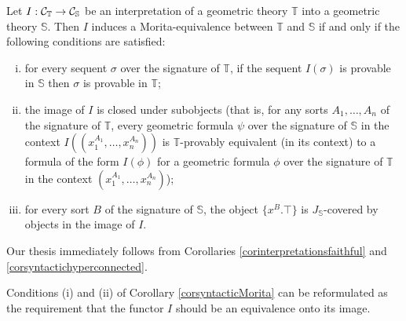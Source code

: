 \documentclass[a4paper,12pt]{article}
\begin{document}
\begin{corollary}\label{corsyntacticMorita}
	Let $I:{\cal C}_{\mathbb T}\to {\cal C}_{\mathbb S}$ be an interpretation of a geometric theory $\mathbb T$ into a geometric theory ${\mathbb S}$. Then $I$ induces a Morita-equivalence between $\mathbb T$ and $\mathbb S$ if and only if the following conditions are satisfied:
	
	\begin{enumerate}[(i)]
		\item for every sequent $\sigma$ over the signature of $\mathbb T$, if the sequent $I(\sigma)$ is provable in $\mathbb S$ then $\sigma$ is provable in $\mathbb T$;
		
		\item the image of $I$ is closed under subobjects (that is, for any sorts $A_{1}, \ldots, A_{n}$ of the signature of $\mathbb T$, every geometric formula $\psi$ over the signature of $\mathbb S$ in the context $I((x_{1}^{A_{1}}, \ldots, x_{n}^{A_{n}}))$ is $\mathbb T$-provably equivalent (in its context) to a formula of the form $I(\phi)$ for a geometric formula $\phi$ over the signature of $\mathbb T$ in the context $(x_{1}^{A_{1}}, \ldots, x_{n}^{A_{n}})$); 	 
		
		\item for every sort $B$ of the signature of $\mathbb S$, the object $\{x^{B}. \top\}$ is $J_{\mathbb S}$-covered by objects in the image of $I$.  
	\end{enumerate}  
\end{corollary}

\begin{proofs}
	Our thesis immediately follows from Corollaries \ref{corinterpretationsfaithful} and \ref{corsyntactichyperconnected}.
\end{proofs}

\begin{remark}
	Conditions (i) and (ii) of Corollary \ref{corsyntacticMorita} can be reformulated as the requirement that the functor $I$ should be an equivalence onto its image.
\end{remark}
\end{document}
